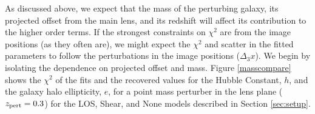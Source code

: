 As discussed above, we expect that the mass of the perturbing galaxy, its projected offset from the main lens, and its redshift will affect its contribution to the higher order terms. If the strongest constraints on $\chi^2$ are from the image positions (as they often are), we might expect the $\chi^2$ and scatter in the fitted parameters to follow the perturbations in the image positions ($\Delta_3 x$). We begin by isolating the dependence on projected offset and mass. Figure \ref{masscompare} shows the $\chi^2$ of the fits and the recovered values for the Hubble Constant, $h$, and the galaxy halo ellipticity, $e$, for a point mass perturber in the lens plane ($z_{\rm pert} = 0.3$) for the LOS, Shear, and None models described in Section \ref{sec:setup}.